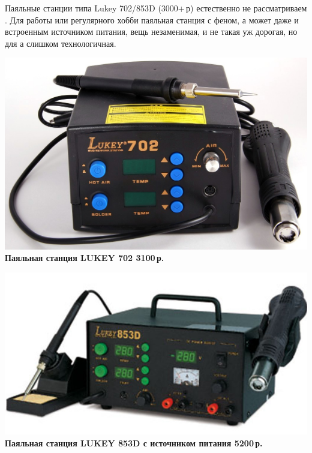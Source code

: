 {Паяльные станции типа Lukey 702/853D (3000+\,р) естественно не рассматриваем
\smiley. Для работы или регулярного хобби паяльная станция с феном, а может даже
и встроенным источником питания, вещь незаменимая, и не такая уж дорогая, но для
\scr а слишком технологичная.

\begin{multicols}{2}
\noindent\href{http://voltmaster-samara.ru/catalog/product/00073444/}{
\includegraphics[width=\columnwidth]{00/fig/Lukey702.jpg}}
\textbf{Паяльная станция LUKEY 702 3100\,р.}

\columnbreak

\noindent\href{http://shop.siriust.ru/product\_info.php/cPath/23\_28\_269/products\_id/15290}{
\includegraphics[width=\columnwidth]{00/fig/Lukey853D.jpg}}
\textbf{Паяльная станция LUKEY 853D с источником питания 5200\,р.}

\end{multicols}


}
